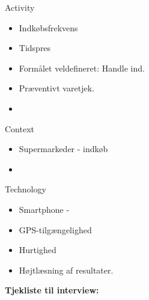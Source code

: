 \documentclass[12pt]{article}
\begin{document}
Activity
\begin{itemize}
\item Indkøbsfrekvens  
\item Tidspres
\item Formålet veldefineret: Handle ind.
\item Præventivt varetjek. 
\item   
\end{itemize}


Context
\begin{itemize}
\item Supermarkeder - indkøb 
\item  
\end{itemize}


Technology
\begin{itemize}
\item Smartphone -   
\item GPS-tilgængelighed
\item Hurtighed
\item Højtlæsning af resultater. 
\end{itemize}

\textbf{Tjekliste til interview:}\\
 
\end{document}
